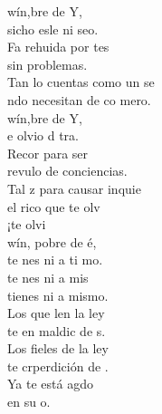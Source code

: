 \begin{cancion}%
	wín,bre de Y,  \\
	sicho esle ni seo.\\
	Fa rehuida por tes \\
sin problemas.\\
	Tan lo cuentas como un se \\
	ndo necesitan de co mero.\\
\jump
	wín,bre de Y,  \\
	e olvio d tra.\\
	Recor para ser\\
	revulo de conciencias.\\
	Tal z para causar inquie\\
	el rico que te olv  \\
	¡te olvi \\
\jump
	wín, pobre de é, \\
	 te nes ni a ti mo.\\
	te nes ni a  mis \\
	tienes ni a mismo.\\
\jump
	Los que len la ley \\
	te en maldic de s.\\
Los fieles de la ley \\
	te crperdición de .\\
\jump
	Ya te está agdo\\
	en su o.\\
\end{cancion}%
